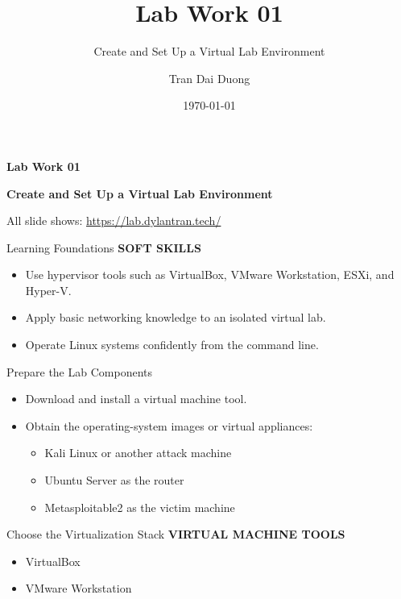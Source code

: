 \documentclass[aspectratio=169,11pt]{beamer}
\title{Lab Work 01}
\subtitle{Create and Set Up a Virtual Lab Environment}
\author{Tran Dai Duong}
\institute{Institute of Information Technology\\Vietnam Academy of Science and Technology}
\date{\today}
\renewcommand{\SlideTag}[1]{%
  {\color{\FrameAccent}\fontsize{18}{22}\selectfont\bfseries #1}\par\vspace{0.25cm}%
}
\begin{document}
\begin{frame}[plain]
  \vfill
  {\color{TitleColor}\fontsize{29}{34}\selectfont\bfseries Lab Work 01\par}
  \vspace{0.45cm}
  {\color{ResearchColor}\fontsize{18}{22}\selectfont\bfseries Create and Set Up a Virtual Lab Environment\par}
  \vspace{0.35cm}
  {\color{SecondaryColor}\fontsize{18}{22}\selectfont All slide shows: \url{https://lab.dylantran.tech/}\par}
  \vfill
\end{frame}

\begin{frame}{Learning Foundations}
  \SlideTag{SOFT SKILLS}
  \begin{itemize}
    \item Use hypervisor tools such as VirtualBox, VMware Workstation, ESXi, and Hyper-V.
    \item Apply basic networking knowledge to an isolated virtual lab.
    \item Operate Linux systems confidently from the command line.
  \end{itemize}
\end{frame}

\begin{frame}{Prepare the Lab Components}
  \begin{itemize}
    \item Download and install a virtual machine tool.
    \item Obtain the operating-system images or virtual appliances:
      \begin{itemize}
        \item Kali Linux or another attack machine
        \item Ubuntu Server as the router
        \item Metasploitable2 as the victim machine
      \end{itemize}
  \end{itemize}
\end{frame}

\begin{frame}{Choose the Virtualization Stack}
  \SlideTag{VIRTUAL MACHINE TOOLS}
  \begin{itemize}
    \item VirtualBox
    \item VMware Workstation
  \end{itemize}
\end{frame}
\end{document}

